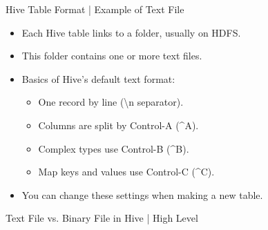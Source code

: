 \begin{frame}{Hive Table Format | Example of Text File}

	\begin{itemize}
		\item Each Hive table links to a folder, usually on HDFS.
		\item This folder contains one or more text files.
		\item Basics of Hive's default text format:
		\begin{itemize}
		  \item One record by line (\textbackslash n separator).
		  \item Columns are split by Control-A (\textasciicircum A).
		  \item Complex types use Control-B (\textasciicircum B).
		  \item Map keys and values use Control-C (\textasciicircum C).
		\end{itemize}
		\item You can change these settings when making a new table.
	  \end{itemize}
	
	\end{frame}
\begin{frame}{Text File vs. Binary File in Hive | High Level}
	\begin{table}[h!]
		\centering
	\caption{Comparison between Text and Binary File Formats in Hive}	
  \end{table}
\end{frame}
